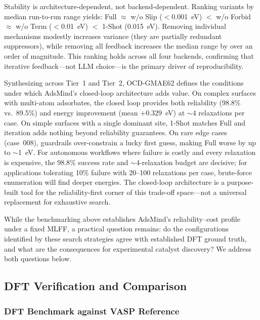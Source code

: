 Stability is architecture-dependent, not backend-dependent.
Ranking variants by median run-to-run range yields: Full $\approx$ w/o Slip ($<$0.001~eV) $<$ w/o Forbid $\approx$ w/o Term ($<$0.01~eV) $<$ 1-Shot (0.015~eV).
Removing individual mechanisms modestly increases variance (they are partially redundant suppressors), while removing all feedback increases the median range by over an order of magnitude.
This ranking holds across all four backends, confirming that iterative feedback---not LLM choice---is the primary driver of reproducibility.

Synthesizing across Tier~1 and Tier~2, OCD-GMAE62 defines the conditions under which AdsMind's closed-loop architecture adds value.
On complex surfaces with multi-atom adsorbates, the closed loop provides both reliability (98.8\% vs.\ 89.5\%) and energy improvement (mean $+0.329$~eV) at $\sim$4 relaxations per case.
On simple surfaces with a single dominant site, 1-Shot matches Full and iteration adds nothing beyond reliability guarantees.
On rare edge cases (case~008), guardrails over-constrain a lucky first guess, making Full worse by up to $\sim$1~eV.
For autonomous workflows where failure is costly and every relaxation is expensive, the 98.8\% success rate and $\sim$4-relaxation budget are decisive; for applications tolerating 10\% failure with 20--100 relaxations per case, brute-force enumeration will find deeper energies.
The closed-loop architecture is a purpose-built tool for the reliability-first corner of this trade-off space---not a universal replacement for exhaustive search.

While the benchmarking above establishes AdsMind's reliability--cost profile under a fixed MLFF, a practical question remains: do the configurations identified by these search strategies agree with established DFT ground truth, and what are the consequences for experimental catalyst discovery? We address both questions below.

\subsection{DFT Verification and Comparison}

\subsubsection{DFT Benchmark against VASP Reference}

